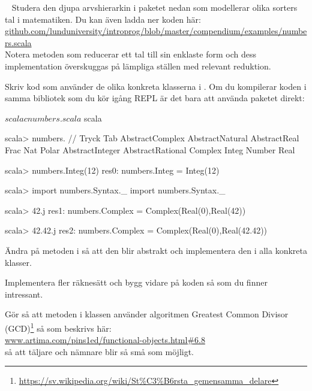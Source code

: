 
\QUESTBEGIN

\Task  \what~ Studera den djupa arvshierarkin i paketet  nedan som modellerar olika sorters tal i matematiken. Du kan även ladda ner koden här: \\
\href{https://github.com/lunduniversity/introprog/blob/master/compendium/examples/numbers.scala}{github.com/lunduniversity/introprog/blob/master/compendium/examples/numbers.scala}
\\ Notera metoden  som reducerar ett tal till sin enklaste form och dess implementation överskuggas på lämpliga ställen med relevant reduktion.

\Subtask Skriv kod som använder de olika konkreta klasserna i . Om du kompilerar koden i samma bibliotek som du kör igång REPL är det bara att använda paketet direkt:
\begin{REPL}
$ scalac numbers.scala
$ scala

scala> numbers.  // Tryck Tab
AbstractComplex   AbstractNatural    AbstractReal   Frac    Nat      Polar
AbstractInteger   AbstractRational   Complex        Integ   Number   Real

scala> numbers.Integ(12)
res0: numbers.Integ = Integ(12)

scala> import numbers.Syntax._
import numbers.Syntax._

scala> 42.j
res1: numbers.Complex = Complex(Real(0),Real(42))

scala> 42.42.j
res2: numbers.Complex = Complex(Real(0),Real(42.42))

\end{REPL}

\Subtask Ändra på metoden \code{+} i  så att den blir abstrakt och implementera den i alla konkreta klasser.

\Subtask Implementera fler räknesätt och bygg vidare på koden så som du finner intressant.

\Subtask Gör så att metoden  i klassen  använder algoritmen Greatest Common Divisor (GCD)\footnote{\href{https://sv.wikipedia.org/wiki/St\%C3\%B6rsta_gemensamma_delare}{https://sv.wikipedia.org/wiki/St\%C3\%B6rsta\_gemensamma\_delare}} så som beskrivs här: \\ \href{http://www.artima.com/pins1ed/functional-objects.html#6.8}{www.artima.com/pins1ed/functional-objects.html\#6.8} \\ så att täljare och nämnare blir så små som möjligt.

\SOLUTION


\QUESTEND
